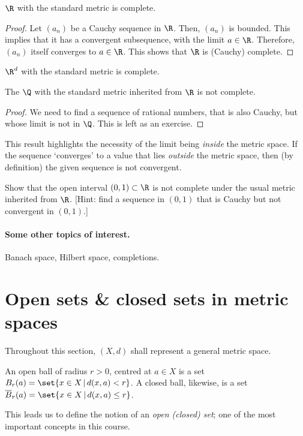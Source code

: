 \documentclass[draft]{penrose}
\newcommand{\oB}{B}
\newcommand{\cB}{\overline{B}}
\begin{document}
\begin{nprop}
  $\R$ with the standard metric is complete.
\end{nprop}
\begin{proof}
  Let $(a_n)$ be a Cauchy sequence in $\R$. Then, $(a_n)$ is bounded. This implies that it has a convergent subsequence, with the limit $a \in \R$. Therefore, $(a_n)$ itself converges to $a \in \R$. This shows that $\R$ is (Cauchy) complete.
\end{proof}

\begin{nprop}
  $\R^d$ with the standard metric is complete.
\end{nprop}

\begin{nprop}
  The $\Q$ with the standard metric inherited from $\R$ is not complete.
\end{nprop}
\begin{proof}
  We need to find a sequence of rational numbers, that is also Cauchy, but whose limit is not in $\Q$. This is left as an exercise.
\end{proof}
This result highlights the necessity of the limit being \emph{inside} the metric space. If the sequence `converges' to a value that lies \emph{outside} the metric space, then (by definition) the given sequence is not convergent.

\begin{nex}
  Show that the open interval $(0,1) \subset \R$ is not complete under the usual metric inherited from $\R$. [Hint: find a sequence in $(0,1)$ that is Cauchy but not convergent in $(0,1)$.]
\end{nex}

\paragraph{Some other topics of interest.} Banach space, Hilbert space, completions.

\section{Open sets \& closed sets in metric spaces}
Throughout this section, $(X,d)$ shall represent a general metric space.

\begin{ndfn}
  An open ball of radius $r>0$, centred at $a \in X$ is a set $\oB_{r}(a) = \set{x \in X \,|\, d(x,a) < r}$. A closed ball, likewise, is a set $\cB_{r}(a) = \set{x \in X \,|\, d(x,a) \leq r}$.
\end{ndfn}
This leads us to define the notion of an \emph{open (closed) set}; one of the most important concepts in this course.
\end{document}
